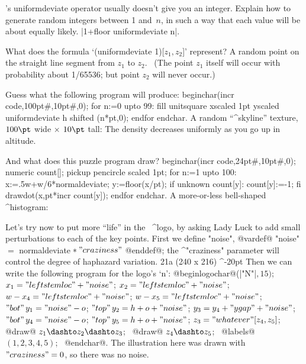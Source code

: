 \exercise \MF's uniformdeviate operator usually doesn't give you an integer.
Explain how to generate random integers between 1 and~$n$, in such a way
that each value will be about equally likely.
\answer |1+floor uniformdeviate n|.

\exercise What does the formula `(uniformdeviate 1)[$z_1,z_2$]' represent?
\answer A random point on the straight line segment from $z_1$ to $z_2$.
\ (The point $z_1$ itself will occur with probability about 1/65536;
but point $z_2$ will never occur.)

\exercise Guess what the following program will produce:
\begintt
beginchar(incr code,100pt#,10pt#,0);
for n:=0 upto 99:
 fill unitsquare xscaled 1pt yscaled uniformdeviate h
  shifted (n*pt,0); endfor endchar.
\endtt
\answer A random ``^{skyline}'' texture, $100\pt$ wide $\times$ $10\pt$ tall:
{\rand{}} The density decreases uniformly as you go up in altitude.

\dangerexercise And what does this puzzle program draw?
\begintt
beginchar(incr code,24pt#,10pt#,0);
numeric count[];
pickup pencircle scaled 1pt;
for n:=1 upto 100:
 x:=.5w+w/6*normaldeviate;
 y:=floor(x/pt);
 if unknown count[y]: count[y]:=-1; fi
 drawdot(x,pt*incr count[y]); endfor endchar.
\endtt
\answer A more-or-less bell-shaped ^{histogram}: {\rand{}}

\danger Let's try now to put more ``life'' in the \MF\ ^{logo}, by
asking Lady Luck to add small perturbations to each of the key points.
First we define "noise",
\begindisplay
@vardef@ "noise" $=$ normaldeviate$\null\ast"craziness"$ @enddef@;
\enddisplay
the ^"craziness" parameter will control the degree of haphazard variation.
\rightfig 21a ({240\apspix} x {216\apspix}) ^-20pt
Then we can write the following program for the logo's `{\manual n}':
\begindisplay
@beginlogochar@\thinspace(|"N"|$,15)$;\cr
$x_1="leftstemloc"+"noise"$;\cr
$x_2="leftstemloc"+"noise"$;\cr
$w-x_4="leftstemloc"+"noise"$;\cr
$w-x_5="leftstemloc"+"noise"$;\cr
$"bot"\,y_1="noise"-o$;\cr
$"top"\,y_2=h+o+"noise"$;\cr
$y_3=y_4+"ygap"+"noise"$;\cr
$"bot"\,y_4="noise"-o$;\cr
$"top"\,y_5=h+o+"noise"$;\cr
$z_3="whatever"[z_4,z_5]$;\cr
@draw@ $z_1\dashto z_2\dashto z_3$; \
@draw@ $z_4\dashto z_5$; \ @labels@$(1,2,3,4,5)$; \ @endchar@.
\enddisplay
The illustration here was drawn with $"craziness"=0$, so there was no noise.


